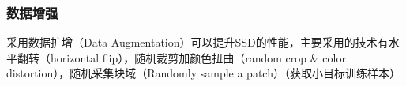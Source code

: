 \subsubsection{数据增强}
采用数据扩增（Data Augmentation）可以提升SSD的性能，主要采用的技术有水平翻转（horizontal flip），随机裁剪加颜色扭曲（random crop \& color distortion），随机采集块域（Randomly sample a patch）（获取小目标训练样本）